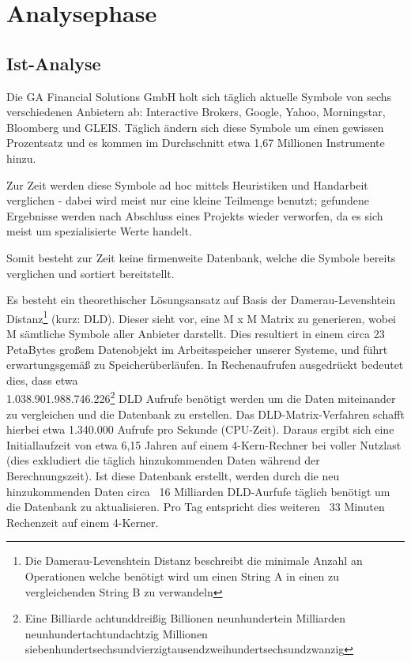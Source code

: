 \section{Analysephase}
\subsection{Ist-Analyse}
Die GA Financial Solutions GmbH holt sich täglich aktuelle Symbole von sechs verschiedenen
Anbietern ab: Interactive Brokers, Google, Yahoo, Morningstar, Bloomberg und GLEIS.
Täglich ändern sich diese Symbole um einen gewissen Prozentsatz und es kommen im Durchschnitt etwa 1,67 Millionen Instrumente hinzu.\par

Zur Zeit werden diese Symbole ad hoc mittels Heuristiken und Handarbeit verglichen -
dabei wird meist nur eine kleine Teilmenge benutzt; gefundene Ergebnisse werden
nach Abschluss eines Projekts wieder verworfen, da es sich meist um spezialisierte Werte handelt.\par

Somit besteht zur Zeit keine firmenweite Datenbank, welche die Symbole
bereits verglichen und sortiert bereitstellt.\par

Es besteht ein theorethischer Lösungsansatz auf Basis der Damerau-Levenshtein Distanz\footnote{Die Damerau-Levenshtein Distanz\cite{dl_distance} beschreibt die minimale Anzahl
	an Operationen welche benötigt wird um einen String A in einen zu
	vergleichenden String B zu verwandeln} (kurz: DLD). Dieser sieht vor, eine M x M Matrix zu generieren, wobei M sämtliche Symbole aller
Anbieter darstellt. Dies resultiert in einem circa 23 PetaBytes großem Datenobjekt
im Arbeitsspeicher unserer Systeme, und führt erwartungsgemäß zu Speicherüberläufen.
In Rechenaufrufen ausgedrückt bedeutet dies, dass etwa \\
1.038.901.988.746.226\footnote{Eine Billiarde achtunddreißig Billionen neunhundertein Milliarden
	neunhundertachtundachtzig Millionen siebenhundertsechsundvierzigtausendzweihundertsechsundzwanzig} DLD Aufrufe benötigt werden um die Daten miteinander
zu vergleichen und die Datenbank zu erstellen. Das DLD-Matrix-Verfahren schafft hierbei 
etwa 1.340.000 Aufrufe pro Sekunde (CPU-Zeit).
Daraus ergibt sich eine Initiallaufzeit von etwa 6,15 Jahren auf einem 4-Kern-Rechner bei voller Nutzlast (dies exkludiert die täglich hinzukommenden Daten
während der Berechnungszeit). Ist diese Datenbank erstellt, werden durch die neu
hinzukommenden Daten circa ~16 Milliarden DLD-Aurfufe täglich benötigt um die
Datenbank zu aktualisieren. Pro Tag entspricht dies weiteren ~33 Minuten Rechenzeit auf
einem 4-Kerner.\par

